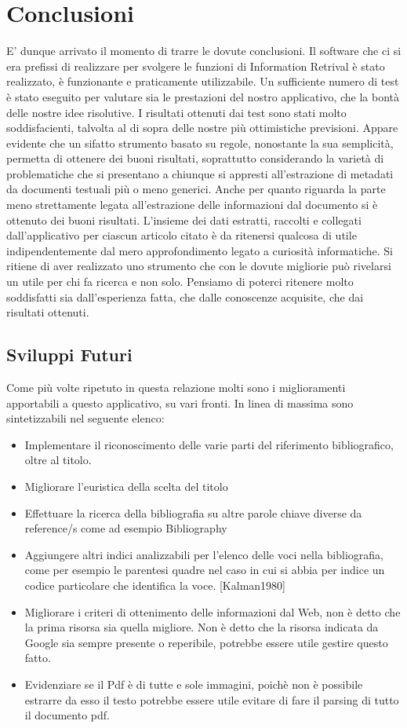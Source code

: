 \section{Conclusioni} \label{conclusioni}
E' dunque arrivato il momento di trarre le dovute conclusioni. Il software che ci si era prefissi di realizzare per svolgere le funzioni di Information Retrival è stato realizzato, è funzionante e praticamente utilizzabile. Un sufficiente numero di test è stato eseguito per valutare sia le prestazioni del nostro applicativo, che la bontà delle nostre idee risolutive. I risultati ottenuti dai test sono stati molto soddisfacienti, talvolta al di sopra delle nostre  più ottimistiche previsioni. Appare evidente che un sifatto strumento basato su regole, nonostante la sua semplicità, permetta di ottenere dei buoni risultati, soprattutto considerando la varietà di problematiche che si presentano a chiunque si appresti all'estrazione di metadati da documenti testuali più o meno generici. Anche per quanto riguarda la parte meno strettamente legata all'estrazione delle informazioni dal documento si è ottenuto dei buoni risultati. L'insieme dei dati estratti, raccolti e collegati dall'applicativo per ciascun articolo citato è da ritenersi qualcosa di utile indipendentemente dal mero approfondimento legato a curiosità informatiche. Si ritiene di aver realizzato uno strumento che con le dovute migliorie può rivelarsi un utile per chi fa ricerca e non solo. Pensiamo di poterci ritenere molto soddisfatti sia dall'esperienza fatta, che dalle conoscenze acquisite, che dai risultati ottenuti. 

\subsection{Sviluppi Futuri}\label{sviluppifuturi}
Come più volte ripetuto in questa relazione molti sono i miglioramenti apportabili a questo applicativo, su vari fronti. In linea di massima sono sintetizzabili nel seguente elenco:

\begin{itemize}
\item Implementare il riconoscimento delle varie parti del riferimento bibliografico, oltre al titolo. 
\item Migliorare l'euristica della scelta del titolo
\item Effettuare la ricerca della bibliografia su altre parole chiave diverse da reference/s come ad esempio Bibliography
\item Aggiungere altri indici analizzabili per l'elenco delle voci nella bibliografia, come per esempio le parentesi quadre nel caso in cui si abbia per indice un codice particolare che identifica la voce. [Kalman1980]
\item Migliorare i criteri di ottenimento delle informazioni dal Web, non è detto che la prima risorsa sia quella migliore. Non è detto che la risorsa indicata da Google sia sempre presente o reperibile, potrebbe essere utile gestire questo fatto.
\item Evidenziare se il Pdf è di tutte e sole immagini, poichè non è possibile estrarre da esso il testo potrebbe essere utile evitare di fare il parsing di tutto il documento pdf.
\end{itemize}

